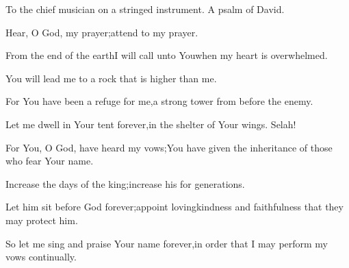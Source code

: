 
\begin{inparaenum}
  \noindent{} To the chief musician on a stringed instrument. A psalm of David.\smallskip%

  \pb{} Hear, O God, my prayer;\pa{}attend to my prayer.%

  \pb{} From the end of the earth\pa{}I will call unto You\pa{}when my heart is overwhelmed.%

  \pb{}You will lead me to a rock that is higher than me.%

  \pb{} For You have been a refuge for me,\pa{}a strong tower from before the enemy.%

  \pb{} Let me dwell in Your tent forever,\pa{}in the shelter of Your wings. Selah!%

  \pb{} For You, O God, have heard my vows;\pa{}You have given  the inheritance of those who fear Your name.%

  \pa{} Increase the days of the king;\pa{}increase his  for generations.%

  \pa{} Let him sit before God forever;\pa{}appoint lovingkindness and faithfulness%
  that they may protect him.%

  \pa{} So let me sing and praise Your name forever,\pa{}in order that I may perform my vows continually.%
\end{inparaenum}
